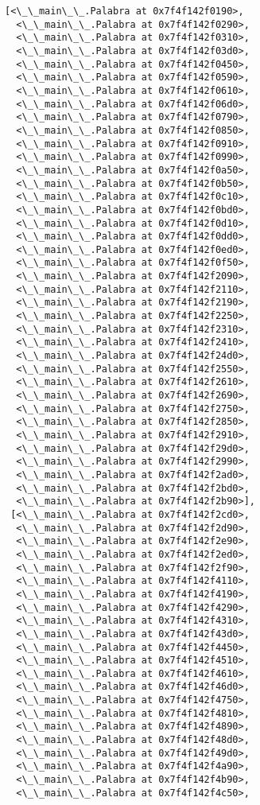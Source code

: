 \documentclass[12pt,a4paper,table]{article}
\begin{document}
\begin{tcolorbox}[breakable, size=fbox, boxrule=.5pt, pad at break*=1mm, opacityfill=0]
\begin{Verbatim}[commandchars=\\\{\}]
 [<\_\_main\_\_.Palabra at 0x7f4f142f0190>,
  <\_\_main\_\_.Palabra at 0x7f4f142f0290>,
  <\_\_main\_\_.Palabra at 0x7f4f142f0310>,
  <\_\_main\_\_.Palabra at 0x7f4f142f03d0>,
  <\_\_main\_\_.Palabra at 0x7f4f142f0450>,
  <\_\_main\_\_.Palabra at 0x7f4f142f0590>,
  <\_\_main\_\_.Palabra at 0x7f4f142f0610>,
  <\_\_main\_\_.Palabra at 0x7f4f142f06d0>,
  <\_\_main\_\_.Palabra at 0x7f4f142f0790>,
  <\_\_main\_\_.Palabra at 0x7f4f142f0850>,
  <\_\_main\_\_.Palabra at 0x7f4f142f0910>,
  <\_\_main\_\_.Palabra at 0x7f4f142f0990>,
  <\_\_main\_\_.Palabra at 0x7f4f142f0a50>,
  <\_\_main\_\_.Palabra at 0x7f4f142f0b50>,
  <\_\_main\_\_.Palabra at 0x7f4f142f0c10>,
  <\_\_main\_\_.Palabra at 0x7f4f142f0bd0>,
  <\_\_main\_\_.Palabra at 0x7f4f142f0d10>,
  <\_\_main\_\_.Palabra at 0x7f4f142f0dd0>,
  <\_\_main\_\_.Palabra at 0x7f4f142f0ed0>,
  <\_\_main\_\_.Palabra at 0x7f4f142f0f50>,
  <\_\_main\_\_.Palabra at 0x7f4f142f2090>,
  <\_\_main\_\_.Palabra at 0x7f4f142f2110>,
  <\_\_main\_\_.Palabra at 0x7f4f142f2190>,
  <\_\_main\_\_.Palabra at 0x7f4f142f2250>,
  <\_\_main\_\_.Palabra at 0x7f4f142f2310>,
  <\_\_main\_\_.Palabra at 0x7f4f142f2410>,
  <\_\_main\_\_.Palabra at 0x7f4f142f24d0>,
  <\_\_main\_\_.Palabra at 0x7f4f142f2550>,
  <\_\_main\_\_.Palabra at 0x7f4f142f2610>,
  <\_\_main\_\_.Palabra at 0x7f4f142f2690>,
  <\_\_main\_\_.Palabra at 0x7f4f142f2750>,
  <\_\_main\_\_.Palabra at 0x7f4f142f2850>,
  <\_\_main\_\_.Palabra at 0x7f4f142f2910>,
  <\_\_main\_\_.Palabra at 0x7f4f142f29d0>,
  <\_\_main\_\_.Palabra at 0x7f4f142f2990>,
  <\_\_main\_\_.Palabra at 0x7f4f142f2ad0>,
  <\_\_main\_\_.Palabra at 0x7f4f142f2bd0>,
  <\_\_main\_\_.Palabra at 0x7f4f142f2b90>],
 [<\_\_main\_\_.Palabra at 0x7f4f142f2cd0>,
  <\_\_main\_\_.Palabra at 0x7f4f142f2d90>,
  <\_\_main\_\_.Palabra at 0x7f4f142f2e90>,
  <\_\_main\_\_.Palabra at 0x7f4f142f2ed0>,
  <\_\_main\_\_.Palabra at 0x7f4f142f2f90>,
  <\_\_main\_\_.Palabra at 0x7f4f142f4110>,
  <\_\_main\_\_.Palabra at 0x7f4f142f4190>,
  <\_\_main\_\_.Palabra at 0x7f4f142f4290>,
  <\_\_main\_\_.Palabra at 0x7f4f142f4310>,
  <\_\_main\_\_.Palabra at 0x7f4f142f43d0>,
  <\_\_main\_\_.Palabra at 0x7f4f142f4450>,
  <\_\_main\_\_.Palabra at 0x7f4f142f4510>,
  <\_\_main\_\_.Palabra at 0x7f4f142f4610>,
  <\_\_main\_\_.Palabra at 0x7f4f142f46d0>,
  <\_\_main\_\_.Palabra at 0x7f4f142f4750>,
  <\_\_main\_\_.Palabra at 0x7f4f142f4810>,
  <\_\_main\_\_.Palabra at 0x7f4f142f4890>,
  <\_\_main\_\_.Palabra at 0x7f4f142f48d0>,
  <\_\_main\_\_.Palabra at 0x7f4f142f49d0>,
  <\_\_main\_\_.Palabra at 0x7f4f142f4a90>,
  <\_\_main\_\_.Palabra at 0x7f4f142f4b90>,
  <\_\_main\_\_.Palabra at 0x7f4f142f4c50>,

\end{Verbatim}
\end{tcolorbox}
\end{document}

